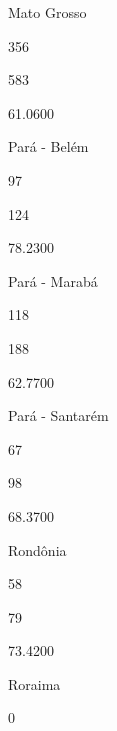 \documentclass[
  letterpaper,
]{report}
\begin{document}
\n      

Mato Grosso

\n      

356

\n      

583

\n      

61.0600

\n    

\n    

\n      

Pará - Belém

\n      

97

\n      

124

\n      

78.2300

\n    

\n    

\n      

Pará - Marabá

\n      

118

\n      

188

\n      

62.7700

\n    

\n    

\n      

Pará - Santarém

\n      

67

\n      

98

\n      

68.3700

\n    

\n    

\n      

Rondônia

\n      

58

\n      

79

\n      

73.4200

\n    

\n    

\n      

Roraima

\n      

0
\end{document}
